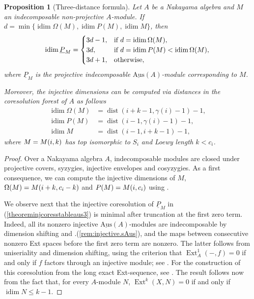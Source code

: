 \documentclass[a4paper]{amsart}
\newtheorem{proposition}[theorem]{Proposition}
\theoremstyle{definition}
\theoremstyle{remark}
\numberwithin{equation}{theorem}
\newcommand{\Ext}{\operatorname{Ext}}
\newcommand{\sAus}{\operatorname{\underline{Aus}}}
\newcommand{\pstab}[1]{\underline{P}_{#1}}
\newcommand{\idim}{\operatorname{idim}}
\newcommand{\dist}{\operatorname{dist}}
\begin{document}
\begin{proposition}[Three-distance formula]
    \label{three:distance:formula}
    Let $A$ be a Nakayama algebra and $M $ an indecomposable non-projective $A$-module. If $ d = \min \{ \idim \Omega(M) , \idim P(M) ,\allowbreak \idim M \} $, then
    \[
      \stabidim=
      \begin{cases}
        3d-1, & \textrm{if } d = \idim \Omega(M),\\
        3d,   & \textrm{if } d = \idim P(M) < \idim \Omega(M) ,\\
        3d+1, & \text{otherwise},
      \end{cases}
    \]
    where $ \pstab M $ is the projective indecomposable $ \sAus(A) $-module corresponding to $ M $.
    
    Moreover, the injective dimensions can be computed via distances in the coresolution forest of $ A $ as follows
  \begin{align*}
      \idim \Omega(M) &= \dist(i+k-1, \gamma(i)-1)-1, \\
      \idim P(M)      &= \dist(i-1, \gamma(i)-1)-1, \\
      \idim M         &= \dist(i-1, i+k-1)-1,
   \end{align*}
    where $ M = \mik $ has top isomorphic to $ S_i $ and Loewy length $ k < c_i $.
\end{proposition}

\begin{proof}
    Over a Nakayama algebra $A$, indecomposable modules are closed under projective covers, syzygies, injective envelopes and cosyzygies. As a first consequence, we  can compute the injective dimensions of $ M $, $\Omega(M) = \mik[i + k][c_i - k]$ and $P(M) = \mik[i][c_i]$ using .


       We observe next that the injective coresolution of $ \pstab M $ in  (\ref{theoreminjcoresstableaus3}) is minimal after truncation at the first zero term. Indeed, all its nonzero injective $ \sAus(A) $-modules are indecomposable by dimension shifting and .(\ref{rem:injective.sAus}), and the maps between consecutive nonzero Ext spaces before the first zero term are nonzero. The latter follows from uniseriality and dimension shifting, using the criterion that $\Ext_A^1(-,f)=0$ if and only if $f$ factors through an injective module; see \cite[discussion following Proposition~I.3.3, p.~18]{AR}. For the construction of this coresolution from the long exact Ext-sequence, see \cite[proof of Proposition~I.3.2, pp.~16--17]{AR}. The result follows now from the fact that, for every $ A $-module $ N $, $\Ext^k(X, N) = 0$ if and only if $\idim N \leq k-1$.
\end{proof}
\end{document}
